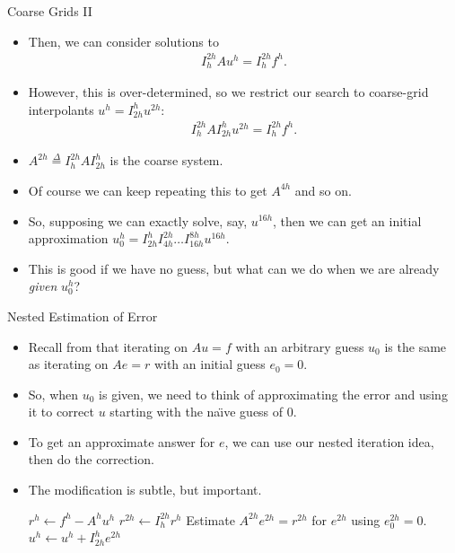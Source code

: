 \documentclass{beamer}
\providecommand{\defeq}{\stackrel{\Delta}{=}}
\begin{document}
\begin{frame}{Coarse Grids II}
 \begin{itemize}
  \item Then, we can consider solutions to
  \begin{align}
   I_h^{2h}Au^h=I_h^{2h}f^h.
  \end{align}
  \item However, this is over-determined, so we restrict our search to
        coarse-grid interpolants $u^h=I_{2h}^hu^{2h}$:
  \begin{align}
   I_h^{2h}AI_{2h}^hu^{2h}=I_h^{2h}f^h.
  \end{align}
  \item $A^{2h} \defeq I_h^{2h}AI_{2h}^h$ is the coarse system.
  \item Of course we can keep repeating this to get $A^{4h}$ and so on.
  \item So, supposing we can exactly solve, say, $u^{16h}$, then we can get
        an initial approximation $u_0^h = I_{2h}^hI_{4h}^{2h}\ldots I_{16h}^{8h} u^{16h}$.
  \item This is good if we have no guess, but what can we do when we are already
        \textit{given} $u_0^h$?
 \end{itemize}
\end{frame}

\begin{frame}{Nested Estimation of Error}
 \begin{itemize}
  \item Recall from \hyperlink{relaxation1}{} that
        iterating on $Au=f$ with an arbitrary guess $u_0$
        is the same as iterating on $Ae=r$ with an initial guess $e_0=0$.
  \item So, when $u_0$ is given, we need to think of approximating the error
        and using it to correct $u$ starting with the na\"{\i}ve guess of $0$.
  \item To get an approximate answer for $e$, we can use our nested iteration
        idea, then do the correction.
  \item The modification is subtle, but important.
        \begin{algorithmic}[1]
         \State $r^h \gets f^h - A^hu^h$
         \State $r^{2h} \gets I_h^{2h} r^h$
         \State Estimate $A^{2h}e^{2h}=r^{2h}$ for $e^{2h}$ using $e_0^{2h}=0$.
         \State $u^h \gets u^h + I_{2h}^he^{2h}$
        \end{algorithmic}
 \end{itemize}
\end{frame}
\end{document}
